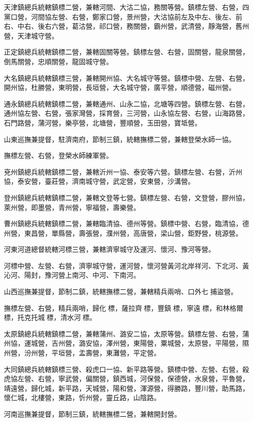 \begin{pinyinscope}
天津鎮總兵統轄鎮標二營，兼轄河間、大沽二協，務關等營。鎮標左營、右營，四黨口營，河間協左營、右營，鄭家口營，景州營，大沽協前左及中左、後左、前右、中右、後右六營，葛沽營，祁口營，務關營，霸州營，武清營，靜海營，舊州營，天津城守營。

正定鎮總兵統轄鎮標二營，兼轄固關等營。鎮標左營、右營，固關營，龍泉關營，倒馬關營，忠順關營，龍固城守營。

大名鎮總兵統轄鎮標三營，兼轄開州協、大名城守等營。鎮標中營、左營、右營，開州協，杜勝營，東明營，長垣營，大名城守營，廣平營，順德營，磁州營。

通永鎮總兵統轄鎮標二營，兼轄通州、山永二協，北塘等四營。鎮標左營、右營，通州協左營、右營，張家灣營，採育營，三河營，山永協左營、右營，山海路營，石門路營，蒲河營，樂亭營，北塘營，豐順營，玉田營，寶坻營。

山東巡撫兼提督，駐濟南府，節制三鎮，統轄撫標二營，兼轄登榮水師一協。

撫標左營、右營，登榮水師練軍營。

兗州鎮總兵統轄鎮標二營，兼轄沂州一協、泰安等六營。鎮標左營、右營，沂州協，泰安營，臺莊營，濟南城守營，武定營，安東營，沙溝營。

登州鎮總兵統轄鎮標二營，兼轄文登等七營。鎮標左營、右營，文登營，膠州協，萊州營，即墨營，青州營，寧福營，壽樂營。

曹州鎮總兵統轄鎮標二營，兼轄臨清協、德州等營。鎮標中營、右營，臨清協，德州營，東昌營，單縣營，壽張營，濮州營，高唐營，梁山營，鉅野營，桃源營。

河東河道總督統轄河標三營，兼轄濟寧城守及運河、懷河、豫河等營。

河標中營、左營、右營，濟寧城守營，運河營，懷河營黃河北岸祥河、下北河、黃沁河、陽封，豫河營上南河、中河、下南河。

山西巡撫兼提督，節制二鎮，統轄撫標二營，兼轄精兵兩哨、口外七捕盜營。

撫標左營、右營，精兵兩哨，歸化標，薩拉齊標，豐鎮標，寧遠標，和林格爾標，托克托城標，清水河標。

太原鎮總兵統轄鎮標二營，兼轄蒲州、潞安二協，太原等營。鎮標左營、右營，蒲州協，運城營，吉州營，潞安協，澤州營，東陽營，粟城營，太原營，平陽營，隰州營，汾州營，平垣營，盂壽營，東灘營，平定營。

大同鎮總兵統轄鎮標三營、殺虎口一協、新平路等營。鎮標中營、左營、右營，殺虎協左營、右營，寧武營，偏關營，鎮西城，河保營，保德營，水泉營，平魯營，靖遠營，歸化城，新平路，天城營，陽和營，渾源營，得勝路，豐川營，助馬路，懷仁城，北樓營，東路，忻州營，靈丘路，山陰路。

河南巡撫兼提督，節制三鎮，統轄撫標二營，兼轄開封營。


\end{pinyinscope}
